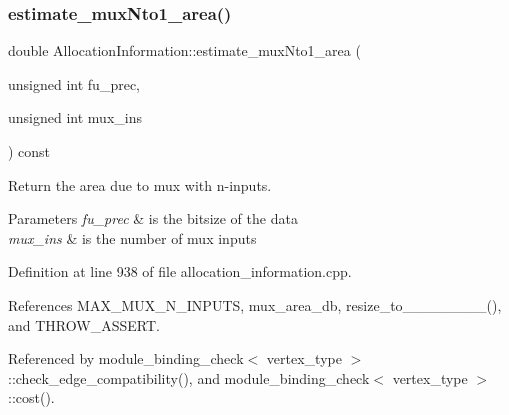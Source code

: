 \subsubsection{\texorpdfstring{estimate\+\_\+mux\+Nto1\+\_\+area()}{estimate\_muxNto1\_area()}}
{\footnotesize\ttfamily double Allocation\+Information\+::estimate\+\_\+mux\+Nto1\+\_\+area (\begin{DoxyParamCaption}\item[{unsigned int}]{fu\+\_\+prec,  }\item[{unsigned int}]{mux\+\_\+ins }\end{DoxyParamCaption}) const}



Return the area due to mux with n-\/inputs. 


\begin{DoxyParams}{Parameters}
{\em fu\+\_\+prec} & is the bitsize of the data \\
\hline
{\em mux\+\_\+ins} & is the number of mux inputs \\
\hline
\end{DoxyParams}


Definition at line 938 of file allocation\+\_\+information.\+cpp.



References M\+A\+X\+\_\+\+M\+U\+X\+\_\+\+N\+\_\+\+I\+N\+P\+U\+TS, mux\+\_\+area\+\_\+db, resize\+\_\+to\+\_\+\_\+\_\+\_\+\_\+\_\+\_\+\_(), and T\+H\+R\+O\+W\+\_\+\+A\+S\+S\+E\+RT.



Referenced by module\+\_\+binding\+\_\+check$<$ vertex\+\_\+type $>$\+::check\+\_\+edge\+\_\+compatibility(), and module\+\_\+binding\+\_\+check$<$ vertex\+\_\+type $>$\+::cost().

